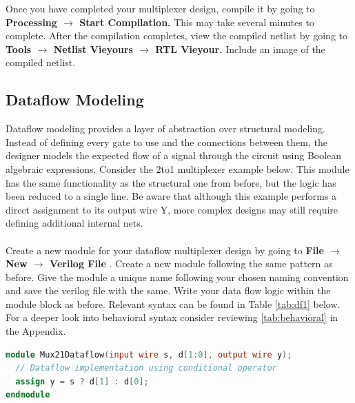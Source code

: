 \documentclass[12pt]{labmanual}
\begin{document}
\begin{question}
    Once you have completed your multiplexer design, compile it by going to \textbf{Processing $\longrightarrow$ Start Compilation.} This may take several minutes to complete. After the compilation completes, view the compiled netlist by going to \textbf{Tools $\longrightarrow$ Netlist Vieyours $\longrightarrow$ RTL Vieyour.} Include an image of the compiled netlist.
\end{question}

\clearpage
\subsection{Dataflow Modeling}
Dataflow modeling provides a layer of abstraction over structural modeling. Instead of defining every gate to use and the connections between them, the designer models the expected flow of a signal through the circuit using Boolean algebraic expressions. Consider the 2to1 multiplexer example below. This module has the same functionality as the structural one from before, but the logic has been reduced to a single line. Be aware that although this example performs a direct assignment to its output wire Y, more complex designs may still require defining additional internal nets. \\
\\
Create a new module for your dataflow multiplexer design by going to \textbf{File $\longrightarrow$ New $\longrightarrow$ Verilog File }. Create a new module following the same pattern as before. Give the module a unique name following your chosen naming convention and save the verilog file with the same. Write your data flow logic within the module block as before. Relevant syntax can be found in Table \ref{tab:df1} below. For a deeper look into behavioral syntax consider reviewing \vref{tab:behavioral} in the Appendix.
\\
\begin{lstlisting}[language=verilog]
module Mux21Dataflow(input wire s, d[1:0], output wire y);
  // Dataflow implementation using conditional operator
  assign y = s ? d[1] : d[0];
endmodule
\end{lstlisting}
\end{document}
